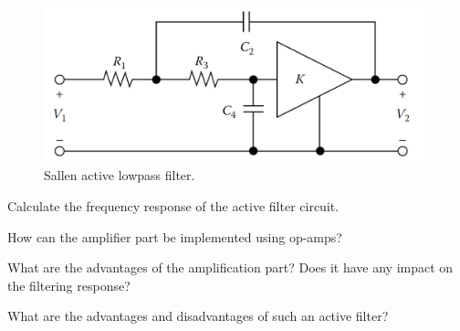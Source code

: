 \documentclass[11pt]{article}
\begin{document}
\begin{question}


    \begin{figure}[H]
        \begin{center}
            \includegraphics[scale=0.3]{Fig/Q5.png}
            \caption{\label{fig:Q5} Sallen active lowpass filter.}
        \end{center}
    \end{figure}

    \begin{subquestion}{Calculate the frequency response of the active filter circuit.}
        \answer{}
    \end{subquestion}
    \begin{subquestion}{How can the amplifier part be implemented using op-amps?}
        \answer{}
    \end{subquestion}
    \begin{subquestion}{What are the advantages of the amplification part? Does it have any impact on the filtering response?}
        \answer{}
    \end{subquestion}
    \begin{subquestion}{What are the advantages and disadvantages of such an active filter?}
        \answer{}
    \end{subquestion}

\end{question}
\end{document}
